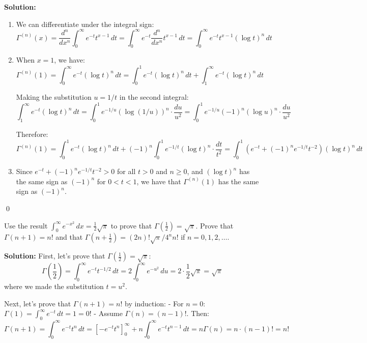 \noindent\textbf{Solution:}
\begin{enumerate}[label=(\alph*)]
    \item We can differentiate under the integral sign:
    \[\Gamma^{(n)}(x) = \frac{d^{n}}{dx^{n}} \int_{0}^{\infty} e^{-t} t^{x-1} \, dt = \int_{0}^{\infty} e^{-t} \frac{d^{n}}{dx^{n}} t^{x-1} \, dt = \int_{0}^{\infty} e^{-t} t^{x-1} (\log t)^{n} \, dt\]
    
    \item When $x = 1$, we have:
    \[\Gamma^{(n)}(1) = \int_{0}^{\infty} e^{-t} (\log t)^{n} \, dt = \int_{0}^{1} e^{-t} (\log t)^{n} \, dt + \int_{1}^{\infty} e^{-t} (\log t)^{n} \, dt\]
    
    Making the substitution $u = 1/t$ in the second integral:
    \[\int_{1}^{\infty} e^{-t} (\log t)^{n} \, dt = \int_{0}^{1} e^{-1/u} (\log(1/u))^{n} \cdot \frac{du}{u^{2}} = \int_{0}^{1} e^{-1/u} (-1)^{n} (\log u)^{n} \cdot \frac{du}{u^{2}}\]
    
    Therefore:
    \[\Gamma^{(n)}(1) = \int_{0}^{1} e^{-t} (\log t)^{n} \, dt + (-1)^{n} \int_{0}^{1} e^{-1/t} (\log t)^{n} \cdot \frac{dt}{t^{2}} = \int_{0}^{1} (e^{-t} + (-1)^{n} e^{-1/t} t^{-2}) (\log t)^{n} \, dt\]
    
    \item Since $e^{-t} + (-1)^{n} e^{-1/t} t^{-2} > 0$ for all $t > 0$ and $n \geq 0$, and $(\log t)^{n}$ has the same sign as $(-1)^{n}$ for $0 < t < 1$, we have that $\Gamma^{(n)}(1)$ has the same sign as $(-1)^{n}$.
\end{enumerate}\qed


\begin{problembox}
Use the result $\int_{0}^{\infty} e^{-x^{2}} \, dx = \frac{1}{2} \sqrt{\pi}$ to prove that $\Gamma(\frac{1}{2}) = \sqrt{\pi}$. Prove that $\Gamma(n + 1) = n!$ and that $\Gamma(n + \frac{1}{2}) = (2n)! \sqrt{\pi}/4^{n}n!$ if $n = 0, 1, 2, \ldots$.
\end{problembox}

\noindent\textbf{Solution:}
First, let's prove that $\Gamma(\frac{1}{2}) = \sqrt{\pi}$:
\[\Gamma\left(\frac{1}{2}\right) = \int_{0}^{\infty} e^{-t} t^{-1/2} \, dt = 2 \int_{0}^{\infty} e^{-u^{2}} \, du = 2 \cdot \frac{1}{2} \sqrt{\pi} = \sqrt{\pi}\]
where we made the substitution $t = u^{2}$.

Next, let's prove that $\Gamma(n + 1) = n!$ by induction:
- For $n = 0$: $\Gamma(1) = \int_{0}^{\infty} e^{-t} \, dt = 1 = 0!$
- Assume $\Gamma(n) = (n-1)!$. Then:
\[\Gamma(n + 1) = \int_{0}^{\infty} e^{-t} t^{n} \, dt = \left[-e^{-t} t^{n}\right]_{0}^{\infty} + n \int_{0}^{\infty} e^{-t} t^{n-1} \, dt = n \Gamma(n) = n \cdot (n-1)! = n!\]

